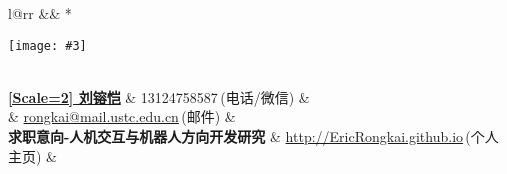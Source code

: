 \newcommand{\paint}[3]{
    \begin{minipage}{#1}
        \texttt{[image: \#3]}
    \end{minipage} 
}
\newcommand{\myheader}{
\begin{tabular*}{\textwidth}{l@{\extracolsep{\fill}}rr}
  && \multirow{4}*{\paint{2.5cm}{3cm}{./image.jpg}}\\
  \specialrule{0em}{0pt}{0pt}
  \textbf{\href{http://EricRongkai.github.io}{\CJKfontspec{微软雅黑}[Scale=2] 刘镕恺}} & 13124758587$\,${\color{labelgrey}(电话/微信)} &\\
   & \href{mailto:zhangzc@pku.edu.cn}{rongkai@mail.ustc.edu.cn}$\,${\color{labelgrey}(邮件)} & \\
   \textbf{求职意向-人机交互与机器人方向开发研究} \quad& \href{mailto:zhangzc@pku.edu.cn}{http://EricRongkai.github.io}$\, ${\color{labelgrey}(个人主页)} & \\
  \end{tabular*}\\\vspace{0.1in}
}

\myheader


